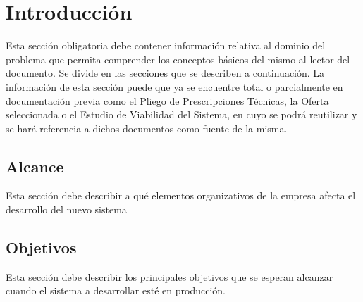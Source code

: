 \thispagestyle{fancy}
\section{Introducción}
 
\begin{textoazul}
Esta sección obligatoria debe contener información relativa al dominio del problema que permita comprender los conceptos básicos del mismo al lector del documento. Se divide en las secciones que se describen a continuación.
La información de esta sección puede que ya se encuentre total o parcialmente en documentación previa como el Pliego de Prescripciones Técnicas, la Oferta seleccionada o el Estudio de Viabilidad del Sistema, en cuyo se podrá reutilizar y se hará referencia a dichos documentos como fuente de la misma.

\end{textoazul}

 \subsection {Alcance} 

\begin{textoazul}
Esta sección debe describir a qué elementos organizativos de la empresa afecta el desarrollo del nuevo sistema
 \end{textoazul}
 
 \subsection {Objetivos}
  
\begin{textoazul}
Esta sección debe describir los principales objetivos que se esperan alcanzar cuando el sistema a desarrollar esté en producción.

 \end{textoazul}
 

